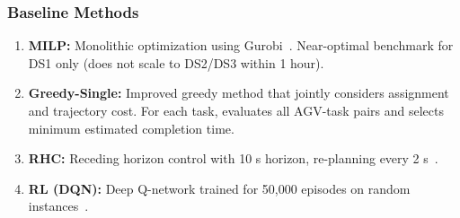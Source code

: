 \documentclass[manuscript,screen,review]{acmart}
\begin{document}
\subsubsection{Baseline Methods}

\begin{enumerate}[leftmargin=*, itemsep=3pt]
	\item \textbf{MILP:} Monolithic optimization using Gurobi~\cite{wang2024more}.
	Near-optimal benchmark for DS1 only (does not scale to DS2/DS3 within 1 hour).    
    
	\item \textbf{Greedy-Single:} Improved greedy method that jointly considers 
	assignment and trajectory cost. For each task, evaluates all AGV-task pairs 
	and selects minimum estimated completion time.

	\item \textbf{RHC:} Receding horizon control with 10 s horizon, re-planning 
	every 2 s~\cite{yan2021rnn}.

	\item \textbf{RL (DQN):} Deep Q-network trained for 50,000 episodes on 
	random instances~\cite{li2022improved}.
\end{enumerate}
\end{document}

